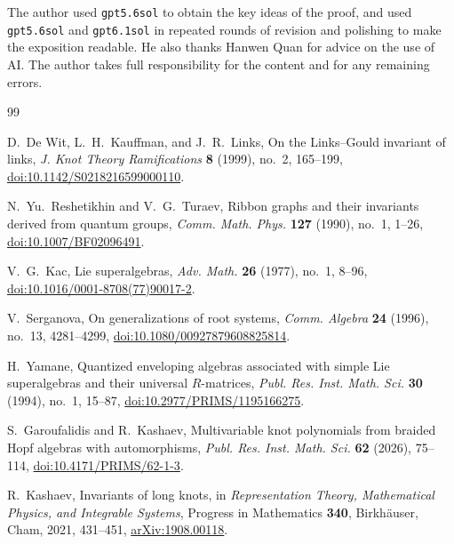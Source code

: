 \documentclass[11pt,a4paper]{article}
\theoremstyle{definition}
\theoremstyle{remark}
\begin{document}
The author used \texttt{gpt5.6sol} to obtain the key ideas of the proof,
and used \texttt{gpt5.6sol} and \texttt{gpt6.1sol} in repeated rounds of
revision and polishing to make the exposition readable.  He also thanks
Hanwen Quan for advice on the use of AI.  The author takes full
responsibility for the content and for any remaining errors.

\begin{thebibliography}{99}
\raggedright

D.~De Wit, L.~H.~Kauffman, and J.~R.~Links,
\newblock On the Links--Gould invariant of links,
\newblock \emph{J. Knot Theory Ramifications} \textbf{8} (1999), no.~2,
165--199,
\newblock \href{https://doi.org/10.1142/S0218216599000110}
{doi:10.1142/S0218216599000110}.

N.~Yu.~Reshetikhin and V.~G.~Turaev,
\newblock Ribbon graphs and their invariants derived from quantum groups,
\newblock \emph{Comm. Math. Phys.} \textbf{127} (1990), no.~1, 1--26,
\newblock \href{https://doi.org/10.1007/BF02096491}
{doi:10.1007/BF02096491}.

V.~G.~Kac,
\newblock Lie superalgebras,
\newblock \emph{Adv. Math.} \textbf{26} (1977), no.~1, 8--96,
\newblock \href{https://doi.org/10.1016/0001-8708(77)90017-2}
{doi:10.1016/0001-8708(77)90017-2}.

V.~Serganova,
\newblock On generalizations of root systems,
\newblock \emph{Comm. Algebra} \textbf{24} (1996), no.~13, 4281--4299,
\newblock \href{https://doi.org/10.1080/00927879608825814}
{doi:10.1080/00927879608825814}.

H.~Yamane,
\newblock Quantized enveloping algebras associated with simple Lie
superalgebras and their universal \(R\)-matrices,
\newblock \emph{Publ. Res. Inst. Math. Sci.} \textbf{30} (1994), no.~1,
15--87,
\newblock \href{https://doi.org/10.2977/PRIMS/1195166275}
{doi:10.2977/PRIMS/1195166275}.

S.~Garoufalidis and R.~Kashaev,
\newblock Multivariable knot polynomials from braided Hopf algebras with
automorphisms,
\newblock \emph{Publ. Res. Inst. Math. Sci.} \textbf{62} (2026), 75--114,
\newblock \href{https://doi.org/10.4171/PRIMS/62-1-3}
{doi:10.4171/PRIMS/62-1-3}.

R.~Kashaev,
\newblock Invariants of long knots,
\newblock in \emph{Representation Theory, Mathematical Physics, and
Integrable Systems}, Progress in Mathematics \textbf{340},
Birkh\"auser, Cham, 2021, 431--451,
\newblock \href{https://arxiv.org/abs/1908.00118}{arXiv:1908.00118}.


\end{thebibliography}
\end{document}
